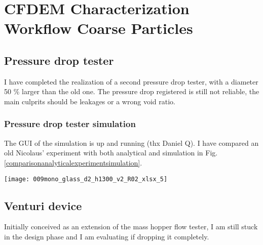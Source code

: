 
\section{CFDEM Characterization Workflow Coarse Particles}
\label{section:CFDemcharacterizationworkflowcoarseparticles}

\subsection{Pressure drop tester}
\label{subsection:pressuredroptester}

I have completed the realization of a second pressure drop tester, with a diameter 50 \% larger than the old one.
The pressure drop registered is still not reliable, the main culprits should be leakages or a wrong void ratio.\\

\subsubsection{Pressure drop tester simulation}
\label{subsubsection:pressuredroptestersimulation}

The GUI of the simulation is up and running (thx Daniel Q).
I have compared an old Nicolaus' experiment with both analytical and simulation in Fig. \ref{comparisonanalyticalexperimentsimulation}. \\

\begin{sidewaysfigure}
\texttt{[image: 009mono\_glass\_d2\_h1300\_v2\_R02\_xlsx\_5]}
\caption{mono glass d2 h1300 v2 R02 xlsx 5}
\label{comparisonanalyticalexperimentsimulation}
\end{sidewaysfigure}

\subsection{Venturi device}
\label{subsection:venturidevice}

Initially conceived as an extension of the mass hopper flow tester, I am still stuck in the design phase and I am evaluating if dropping it completely.\\